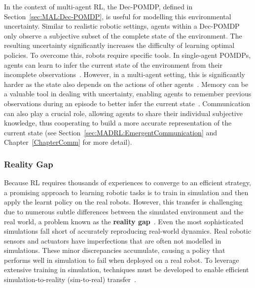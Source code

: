 In the context of multi-agent RL, the Dec-POMDP, defined in Section~\ref{sec:MAL:Dec-POMDP}, is useful for modelling this environmental uncertainty. Similar to realistic robotic settings, agents within a Dec-POMDP only observe a subjective subset of the complete state of the environment. The resulting uncertainty significantly increases the difficulty of learning optimal policies. To overcome this, robots require specific tools. In single-agent POMDPs, agents can learn to infer the current state of the environment from their incomplete observations~\citep{Abbeel2006_Helicopter, Lee2019_SLAC}. However, in a multi-agent setting, this is significantly harder as the state also depends on the actions of other agents~\citep{Papadimitriou1987_Complexity, Oliehoek2016_DecPOMDP}. Memory can be a valuable tool in dealing with uncertainty, enabling agents to remember previous observations during an episode to better infer the current state~\citep{Hausknecht2015_DRQN}. Communication can also play a crucial role, allowing agents to share their individual subjective knowledge, thus cooperating to build a more accurate representation of the current state (see Section~\ref{sec:MADRL:EmergentCommunication} and Chapter~\ref{ChapterComm} for more detail). 


\subsubsection{Reality Gap}\label{sec:MAL:RealityGap}

Because RL requires thousands of experiences to converge to an efficient strategy, a promising approach to learning robotic tasks is to train in simulation and then apply the learnt policy on the real robots. However, this transfer is challenging due to numerous subtle differences between the simulated environment and the real world, a problem known as the \textbf{reality gap}~\citep{Jakobi1995_RealityGap}. Even the most sophisticated simulations fall short of accurately reproducing real-world dynamics. Real robotic sensors and actuators have imperfections that are often not modelled in simulations. These minor discrepancies accumulate, causing a policy that performs well in simulation to fail when deployed on a real robot. To leverage extensive training in simulation, techniques must be developed to enable efficient simulation-to-reality (sim-to-real) transfer~\citep{Ju2022_Sim2Real}. 

